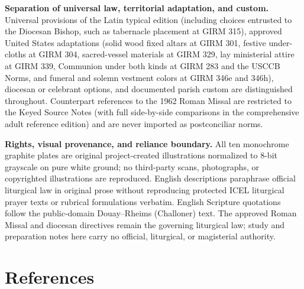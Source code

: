 \textbf{Separation of universal law, territorial adaptation, and custom.} Universal provisions of the Latin typical edition (including choices entrusted to the Diocesan Bishop, such as tabernacle placement at GIRM 315), approved United States adaptations (solid wood fixed altars at GIRM 301, festive under-cloths at GIRM 304, sacred-vessel materials at GIRM 329, lay ministerial attire at GIRM 339, Communion under both kinds at GIRM 283 and the USCCB Norms, and funeral and solemn vestment colors at GIRM 346e and 346h), diocesan or celebrant options, and documented parish custom are distinguished throughout. Counterpart references to the 1962 Roman Missal are restricted to the Keyed Source Notes (with full side-by-side comparisons in the comprehensive adult reference edition) and are never imported as postconciliar norms.

\textbf{Rights, visual provenance, and reliance boundary.} All ten monochrome graphite plates are original project-created illustrations normalized to 8-bit grayscale on pure white ground; no third-party scans, photographs, or copyrighted illustrations are reproduced. English descriptions paraphrase official liturgical law in original prose without reproducing protected ICEL liturgical prayer texts or rubrical formulations verbatim. English Scripture quotations follow the public-domain Douay--Rheims (Challoner) text. The approved Roman Missal and diocesan directives remain the governing liturgical law; study and preparation notes here carry no official, liturgical, or magisterial authority.

\section*{References}
